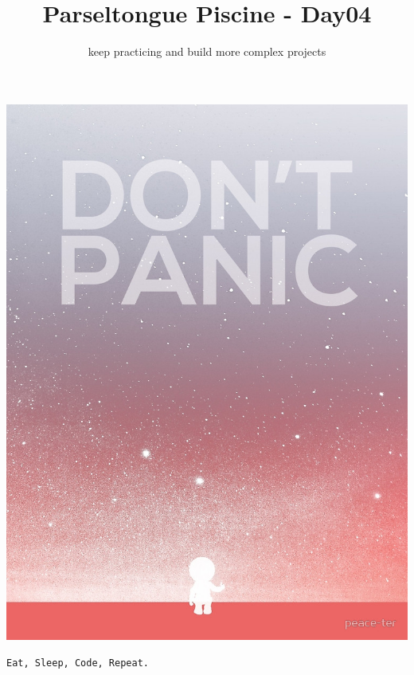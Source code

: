 \documentclass{42-en}
\begin{document}
\title{Parseltongue Piscine - Day04}
\subtitle{keep practicing and build more complex projects}


\maketitle

\tableofcontents


\newpage

\bigskip

\centerline{\includegraphics[width=150mm]{images/dont_panic.jpeg}}

\centerline{\texttt{Eat, Sleep, Code, Repeat.}}

\end{document}
